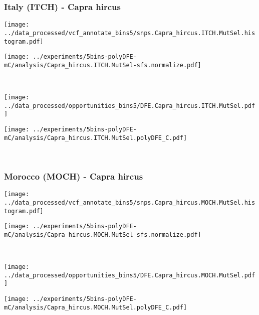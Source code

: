 \subsubsection{Italy (ITCH) - Capra hircus}

\begin{minipage}{0.49\linewidth}
    \texttt{[image: ../data\_processed/vcf\_annotate\_bins5/snps.Capra\_hircus.ITCH.MutSel.histogram.pdf]}
\end{minipage}
\begin{minipage}{0.49\linewidth}
    \texttt{[image: ../experiments/5bins-polyDFE-mC/analysis/Capra\_hircus.ITCH.MutSel-sfs.normalize.pdf]}
\end{minipage}
\\
\begin{minipage}{0.49\linewidth}
    \texttt{[image: ../data\_processed/opportunities\_bins5/DFE.Capra\_hircus.ITCH.MutSel.pdf]}
\end{minipage}
\begin{minipage}{0.49\linewidth}
    \texttt{[image: ../experiments/5bins-polyDFE-mC/analysis/Capra\_hircus.ITCH.MutSel.polyDFE\_C.pdf]}
\end{minipage}
\\

\subsubsection{Morocco (MOCH) - Capra hircus}

\begin{minipage}{0.49\linewidth}
    \texttt{[image: ../data\_processed/vcf\_annotate\_bins5/snps.Capra\_hircus.MOCH.MutSel.histogram.pdf]}
\end{minipage}
\begin{minipage}{0.49\linewidth}
    \texttt{[image: ../experiments/5bins-polyDFE-mC/analysis/Capra\_hircus.MOCH.MutSel-sfs.normalize.pdf]}
\end{minipage}
\\
\begin{minipage}{0.49\linewidth}
    \texttt{[image: ../data\_processed/opportunities\_bins5/DFE.Capra\_hircus.MOCH.MutSel.pdf]}
\end{minipage}
\begin{minipage}{0.49\linewidth}
    \texttt{[image: ../experiments/5bins-polyDFE-mC/analysis/Capra\_hircus.MOCH.MutSel.polyDFE\_C.pdf]}
\end{minipage}
\\

